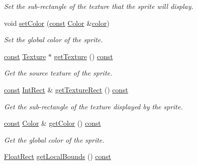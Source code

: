 \begin{DoxyCompactItemize}
\begin{DoxyCompactList}\small\item\em Set the sub-\/rectangle of the texture that the sprite will display. \end{DoxyCompactList}\item 
void \hyperlink{classsf_1_1_sprite_a14def44da6437bfea20c4df5e71aba4c}{set\-Color} (\hyperlink{term__entry_8h_a57bd63ce7f9a353488880e3de6692d5a}{const} \hyperlink{classsf_1_1_color}{Color} \&\hyperlink{_entity_8cpp_a864889304a90873adb9c6e289a54bcf4}{color})
\begin{DoxyCompactList}\small\item\em Set the global color of the sprite. \end{DoxyCompactList}\item 
\hyperlink{term__entry_8h_a57bd63ce7f9a353488880e3de6692d5a}{const} \hyperlink{classsf_1_1_texture}{Texture} $\ast$ \hyperlink{classsf_1_1_sprite_a2c4fbb983b29e14f9bb69a3a75feae46}{get\-Texture} () \hyperlink{term__entry_8h_a57bd63ce7f9a353488880e3de6692d5a}{const} 
\begin{DoxyCompactList}\small\item\em Get the source texture of the sprite. \end{DoxyCompactList}\item 
\hyperlink{term__entry_8h_a57bd63ce7f9a353488880e3de6692d5a}{const} \hyperlink{namespacesf_a1b1279ab06950b96686cffaacb72fed5}{Int\-Rect} \& \hyperlink{classsf_1_1_sprite_a89aa58bc39e2072c6afe7c547d27b5a0}{get\-Texture\-Rect} () \hyperlink{term__entry_8h_a57bd63ce7f9a353488880e3de6692d5a}{const} 
\begin{DoxyCompactList}\small\item\em Get the sub-\/rectangle of the texture displayed by the sprite. \end{DoxyCompactList}\item 
\hyperlink{term__entry_8h_a57bd63ce7f9a353488880e3de6692d5a}{const} \hyperlink{classsf_1_1_color}{Color} \& \hyperlink{classsf_1_1_sprite_ab05fafd4e9999608a5cae4985e7b52df}{get\-Color} () \hyperlink{term__entry_8h_a57bd63ce7f9a353488880e3de6692d5a}{const} 
\begin{DoxyCompactList}\small\item\em Get the global color of the sprite. \end{DoxyCompactList}\item 
\hyperlink{namespacesf_ab0d978f5903922a6bdfca1736b71ccc9}{Float\-Rect} \hyperlink{classsf_1_1_sprite_a69557a8369bc2e26dd2e2eb2c50f5c90}{get\-Local\-Bounds} () \hyperlink{term__entry_8h_a57bd63ce7f9a353488880e3de6692d5a}{const} 

\end{DoxyCompactItemize}
